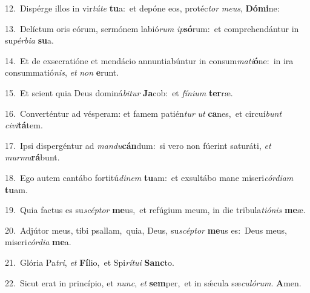 {\numbfont\textcolor{\numbcolor}{12.}}~Dispérge illos in vir\-\textit{tú}\-\textit{te} \textbf{tu}\-a:~\star et depóne eos, protéc\textit{tor} \textit{me}\-\textit{us}, \textbf{Dó}\-\textbf{mi}ne:\par
{\numbfont\textcolor{\numbcolor}{13.}}~Delíctum oris eórum, sermónem labió\textit{rum} \textit{ip}\-\textbf{só}rum:~\star et comprehendántur in su\-\textit{pér}\-\textit{bi}\textit{a} \textbf{su}\-a.\par
{\numbfont\textcolor{\numbcolor}{14.}}~Et de exsecratióne et mendácio annuntiabúntur in consum\-\textit{ma}\-\textit{ti}\textbf{ó}ne:~\star in ira consummatió\-\textit{nis}\-, \textit{et} \textit{non} \textbf{e}\-runt.\par
{\numbfont\textcolor{\numbcolor}{15.}}~Et scient quia Deus dominá\-\textit{bi}\-\textit{tur} \textbf{Ja}\-cob:~\star et \textit{fí}\-\textit{ni}\textit{um} \textbf{ter}\-ræ.\par
{\numbfont\textcolor{\numbcolor}{16.}}~Converténtur ad vésperam: et famem patién\textit{tur} \textit{ut} \textbf{ca}\-nes,~\star et circuí\textit{bunt} \textit{ci}\-\textit{vi}\textbf{tá}tem.\par
{\numbfont\textcolor{\numbcolor}{17.}}~Ipsi dispergéntur ad \textit{man}\-\textit{du}\textbf{cán}dum:~\star si vero non fúerint saturáti, \textit{et} \textit{mur}\-\textit{mu}\textbf{rá}bunt.\par
{\numbfont\textcolor{\numbcolor}{18.}}~Ego autem cantábo fortitú\-\textit{di}\-\textit{nem} \textbf{tu}\-am:~\star et exsultábo mane miseri\-\textit{cór}\-\textit{di}\textit{am} \textbf{tu}\-am.\par
{\numbfont\textcolor{\numbcolor}{19.}}~Quia factus es su\-\textit{scép}\-\textit{tor} \textbf{me}\-us,~\star et refúgium meum, in die tribula\-\textit{ti}\-\textit{ó}\textit{nis} \textbf{me}\-æ.\par
{\numbfont\textcolor{\numbcolor}{20.}}~Adjútor meus, tibi psallam,~\dagger quia, Deus, su\-\textit{scép}\-\textit{tor} \textbf{me}\-us es:~\star Deus meus, miseri\-\textit{cór}\-\textit{di}\textit{a} \textbf{me}\-a.\par
{\numbfont\textcolor{\numbcolor}{21.}}~Glória Pa\-\textit{tri}\-, \textit{et} \textbf{Fí}\-lio,~\star et Spi\-\textit{rí}\-\textit{tu}\textit{i} \textbf{Sanc}\-to.\par
{\numbfont\textcolor{\numbcolor}{22.}}~Sicut erat in princípio, et \textit{nunc}\-, \textit{et} \textbf{sem}\-per,~\star et in sǽcula sæ\-\textit{cu}\-\textit{ló}\textit{rum}. \textbf{A}\-men.\par
